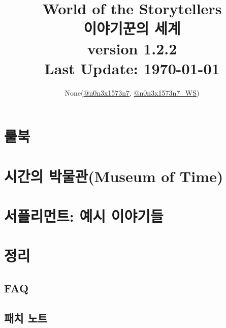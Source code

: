 \documentclass[12pt]{report}
\title{
	World of the Storytellers\\
	이야기꾼의 세계\\
	\large version 1.2.2\\
	Last Update: \today \\
}
\author{None(\href{https://www.twitter.com/n0n3x1573n7}{@n0n3x1573n7}, \href{https://www.twitter.com/n0n3x1573n7_WS}{@n0n3x1573n7\_WS})}
\date{}
\begin{document}
	\maketitle

	\vspace*{\fill}
	{\doclicenseThis}
	
	\setcounter{tocdepth}{-1}
	
\iffalse
	\chapter*{서론}
		
\fi
	
	\tableofcontents
	
	\part{룰북}
		
	
	\part{시간의 박물관(Museum of Time)}
		
	
	\part{서플리먼트: 예시 이야기들} \label{endof_MoT}
		
	
	\part{정리}
		\chapter*{FAQ}
			
		
		\chapter*{패치 노트}
			
		
			\printindex
	
	\vspace*{\fill}
	{\doclicenseThis}
	
\end{document}
